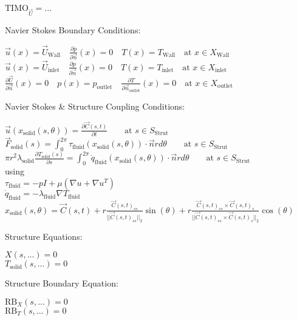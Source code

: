 \documentclass[10pt]{article} %
\begin{document}
\begin{center}
	$\text{TIMO}_{\vec{U}} = ...$\\
\begin{flushleft}
	Navier Stokes Boundary Conditions:
\end{flushleft}
	$\vec{u}(x)=\vec{U}_{\text{Wall}} \quad \frac{\partial p}{\partial \vec{n}}(x)=0 \quad  T(x) = T_{\text{Wall}} \quad  \text{at } x \in X_{\text{Wall}}$\\
	$\vec{u}(x)=\vec{U}_{\text{inlet}} \quad \frac{\partial p}{\partial \vec{n}}(x)=0 \quad  T(x) = T_{\text{inlet}} \quad \text{at } x \in X_{\text{inlet}}$\\
	$\frac{\partial \vec{U}}{\partial \vec{n}}(x) = 0\quad p(x)=p_{\text{outlet}} \quad  \frac{\partial T}{\partial \vec{n}_{\text{outlet}}}(x) = 0 \quad \text{at } x \in X_{\text{outlet}}$\\
\begin{flushleft}
	Navier Stokes \& Structure Coupling Conditions:
\end{flushleft}
	$\vec{u}(x_{\text{solid}}\left(s,\theta\right))= \frac{\partial \vec{C}(s,t)}{\partial t} \quad \quad \text{at } s \in S_{\text{Strut}}$\\
	$ \vec{F}_{\text{solid}}(s) = \int_0^{2\pi} \tau_{\text{fluid}}(x_{\text{solid}}(s,\theta)) \cdot \vec{n} r d\theta \quad  \quad \text{at } s \in S_{\text{Strut}}$\\
	$ \pi r^2 \lambda_{\text{solid}} \frac{\partial T_{\text{solid}}(s)}{\partial s} = \int_0^{2\pi} \dot q_{\text{fluid}}(x_{\text{solid}}(s,\theta)) \cdot \vec{n} r d\theta \quad  \quad \text{at } s \in S_{\text{Strut}}$\\
	using\\
	$\tau_{\text{fluid}} = - p I + \mu \left(\nabla u + \nabla u ^T\right)$\\
	$\dot q_{\text{fluid}} = - \lambda_{\text{fluid}} \nabla T_{\text{fluid}}$\\
	$x_{\text{solid}}\left(s,\theta\right) = \vec{C}(s,t) + r\frac{\vec{C}(s,t)_{ss}}{\lvert \lvert \vec{C}(s,t)_{ss} \lvert \lvert_2}\sin(\theta) + r\frac{\vec{C}(s,t)_{ss} \times \vec{C}(s,t)_{s}}{\lvert \lvert \vec{C}(s,t)_{ss} \times \vec{C}(s,t)_{s} \lvert \lvert_2}\cos(\theta) $\\
\begin{flushleft}
	Structure Equations:
\end{flushleft}
	$X(s,...) = 0$\\
	$T_{\text{solid}}(s,...) =0$\\
\begin{flushleft}
	Structure Boundary Equation:
\end{flushleft}
	$\text{RB}_X(s,...) = 0$\\
	$\text{RB}_T(s,...) =0$\\
\end{center}
\end{document}
